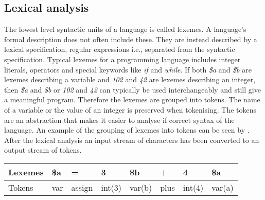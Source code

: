 \subsection{Lexical analysis}
The lowest level syntactic units of a language is called lexemes. A language's formal description does not often include these. They are instead described by a lexical specification, regular expressions i.e., separated from the syntactic specification\cite[p. 135]{sebesta2013}. Typical lexemes for a programming language includes integer literals, operators and special keywords like \textit{if} and \textit{while}. If both \textit{\$a} and \textit{\$b} are lexemes describing a variable and \textit{102} and \textit{42} are lexemes describing an integer, then \textit{\$a} and \textit{\$b} or \textit{102} and \textit{42} can typically be used interchangeably and still give a meaningful program. Therefore the lexemes are grouped into tokens. The name of a variable or the value of an integer is preserved when tokenising. The tokens are an abstraction that makes it easier to analyse if correct syntax of the language. An example of the grouping of lexemes into tokens can be seen by . After the lexical analysis an input stream of characters has been converted to an output stream of tokens.

\begin{table}
\center
    \begin{tabular}{|l|l|l|l|l|l|l|l|}
        \hline
        Lexemes & \$a  & =      & 3   & \$b  & +    & 4   & \$a  \\ \hline
        Tokens & var & assign & int(3) & var(b) & plus & int(4) & var(a)  \\
        \hline
    \end{tabular}
    \label{table:lexandtokens}
\end{table}

